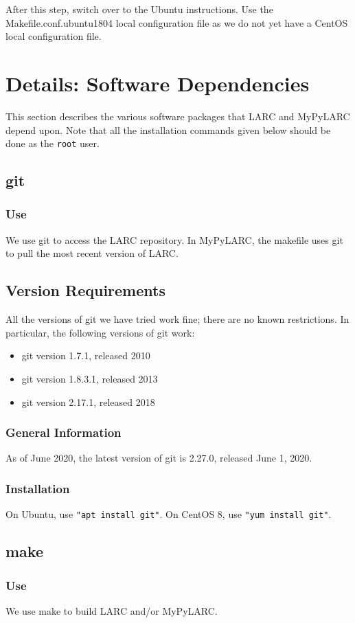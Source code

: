 \documentclass{article}
\begin{document}
\noindent
After this step, switch over to the Ubuntu instructions.
Use the Makefile.conf.ubuntu1804 local configuration file as
we do not yet have a CentOS local configuration file.


\section{Details: Software Dependencies}
This section describes the various software packages
that LARC and MyPyLARC depend upon.
Note that all the installation commands given
below should be done as the {\tt root} user.

\subsection{git}
\subsubsection{Use}
We use git to access the LARC repository.
In MyPyLARC, the makefile uses git to pull the
most recent version of LARC.
\subsection{Version Requirements}
All the versions of git we have tried work fine;
there are no known restrictions.
In particular, the following versions of git work:
\begin{itemize}
\item git version 1.7.1, released 2010
\item git version 1.8.3.1, released 2013
\item git version 2.17.1, released 2018
\end{itemize}
\subsubsection{General Information}
As of June 2020, the latest version of git is 2.27.0,
released June 1, 2020.
\subsubsection{Installation}
On Ubuntu, use {\tt "apt install git"}.
On CentOS 8, use {\tt "yum install git"}.

\subsection{make}
\subsubsection{Use}
We use make to build LARC and/or MyPyLARC.
\end{document}
